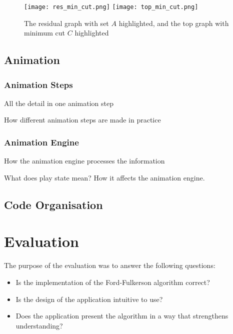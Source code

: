 \documentclass{l4proj}
\begin{document}
\begin{figure}[h]
    \centering
    \texttt{[image: res\_min\_cut.png]}
     \texttt{[image: top\_min\_cut.png]}
    \caption{The residual graph with set $A$ highlighted, and the top graph with minimum cut $C$ highlighted}
\end{figure}
\begin{figure}[h]
    \centering

\end{figure}

\section{Animation}
\subsection{Animation Steps}
All the detail in one animation step

How different animation steps are made in practice

\subsection{Animation Engine}
How the animation engine processes the information

What does play state mean? How it affects the animation engine.

\section{Code Organisation}

\chapter{Evaluation}
\begin{comment}

What did we do? (state precisely how you went about evaluation; methods, apparatus, and procedure such that someone else could reproduces your experiment and get same data)
What data did we get? (present summary of results)
Analyse data. (graphs, stats or tables which draw out evidence that answers your questions from the data)
Draw conclusions. (answer the questions you asked precisely, referring to your analysis)
\end{comment}
The purpose of the evaluation was to answer the following questions:
\begin{itemize}
    \item Is the implementation of the Ford-Fulkerson algorithm correct?
    \item Is the design of the application intuitive to use?
    \item Does the application present the algorithm in a way that strengthens understanding?
\end{itemize}
\end{document}
